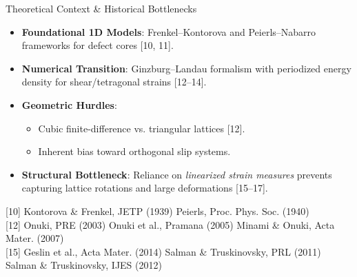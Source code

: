 \begin{frame}{Theoretical Context \& Historical Bottlenecks}
    \begin{itemize}
        \item \textbf{Foundational 1D Models}: Frenkel--Kontorova and Peierls--Nabarro frameworks for defect cores [10, 11].
        \item \textbf{Numerical Transition}: Ginzburg--Landau formalism with periodized energy density for shear/tetragonal strains [12--14].
        \item \textbf{Geometric Hurdles}:
        \begin{itemize}
            \item Cubic finite-difference vs. triangular lattices [12]. 
            \item Inherent bias toward orthogonal slip systems.
        \end{itemize}
        \item \textbf{Structural Bottleneck}: Reliance on \textit{linearized strain measures} prevents capturing lattice rotations and large deformations [15--17].
    \end{itemize}

    \vfill
    {\tiny {[10]} Kontorova \& Frenkel, JETP (1939) \quad {[11]} Peierls, Proc. Phys. Soc. (1940) \\
    {[12]} Onuki, PRE (2003) \quad {[13]} Onuki et al., Pramana (2005) \quad {[14]} Minami \& Onuki, Acta Mater. (2007) \\
    {[15]} Geslin et al., Acta Mater. (2014) \quad {[16]} Salman \& Truskinovsky, PRL (2011) \quad {[17]} Salman \& Truskinovsky, IJES (2012)}
\end{frame}
